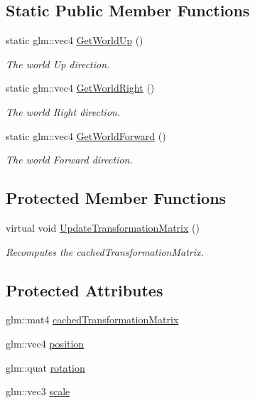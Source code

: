 \subsection*{Static Public Member Functions}
\begin{DoxyCompactItemize}
\item
static glm\+::vec4 \hyperlink{class_scene_object_a334a5fb4e91d85fe6a046bd83dd235d3}{Get\+World\+Up} ()
\begin{DoxyCompactList}\small\item\em The world \textquotesingle{}Up\textquotesingle{} direction. \end{DoxyCompactList}\item
static glm\+::vec4 \hyperlink{class_scene_object_a46d0ffed082f7bd515b9550ef9f9a86a}{Get\+World\+Right} ()
\begin{DoxyCompactList}\small\item\em The world \textquotesingle{}Right\textquotesingle{} direction. \end{DoxyCompactList}\item
static glm\+::vec4 \hyperlink{class_scene_object_a6fa71efda895933be4ee684745980e68}{Get\+World\+Forward} ()
\begin{DoxyCompactList}\small\item\em The world \textquotesingle{}Forward\textquotesingle{} direction. \end{DoxyCompactList}\end{DoxyCompactItemize}
\subsection*{Protected Member Functions}
\begin{DoxyCompactItemize}
\item
virtual void \hyperlink{class_scene_object_a20e31da3f9d2765de50cdb2d637ae6c9}{Update\+Transformation\+Matrix} ()
\begin{DoxyCompactList}\small\item\em Recomputes the cached\+Transformation\+Matrix. \end{DoxyCompactList}\end{DoxyCompactItemize}
\subsection*{Protected Attributes}
\begin{DoxyCompactItemize}
\item
glm\+::mat4 \hyperlink{class_scene_object_aac3f13eea8a7b455e8cffc6eceef211c}{cached\+Transformation\+Matrix}
\item
glm\+::vec4 \hyperlink{class_scene_object_ab4aa9bed778001970c38ea11ef34b285}{position}
\item
glm\+::quat \hyperlink{class_scene_object_ae27376aaca87543a75b5a2cd0daf6e2f}{rotation}
\item
glm\+::vec3 \hyperlink{class_scene_object_a62c686b880fe4f58dec64a409e56de26}{scale}
\end{DoxyCompactItemize}
